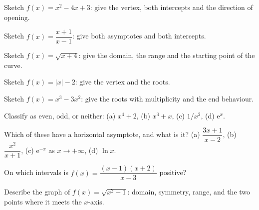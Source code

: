 \begin{gallery}
\hfill
{}\hfill
{}
\end{gallery}

\begin{problems}[resume]
  \item Sketch $f(x)=x^{2}-4x+3$: give the vertex, both intercepts and the
        direction of opening.
  \item Sketch $f(x)=\dfrac{x+1}{x-1}$: give both asymptotes and both
        intercepts.
  \item Sketch $f(x)=\sqrt{x+4}$: give the domain, the range and the
        starting point of the curve.
  \item Sketch $f(x)=|x|-2$: give the vertex and the roots.
  \item Sketch $f(x)=x^{3}-3x^{2}$: give the roots with multiplicity and
        the end behaviour.
  \item Classify as even, odd, or neither: (a) $x^{4}+2$, \;(b) $x^{3}+x$,
        \;(c) $1/x^{2}$, \;(d) $\mathrm{e}^{x}$.
  \item Which of these have a horizontal asymptote, and what is it?
        (a) $\dfrac{3x+1}{x-2}$, \;(b) $\dfrac{x^{2}}{x+1}$,
        \;(c) $\mathrm{e}^{-x}$ as $x\to+\infty$, \;(d) $\ln x$.
  \item On which intervals is $f(x)=\dfrac{(x-1)(x+2)}{x-3}$ positive?
  \item Describe the graph of $f(x)=\sqrt{x^{2}-1}$: domain, symmetry,
        range, and the two points where it meets the $x$-axis.
\end{problems}

